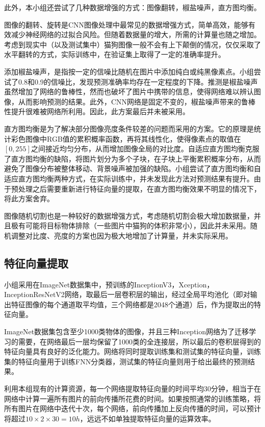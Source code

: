 \documentclass[10.5pt,twocolumn]{jbuaa}
\begin{document}
此外，本小组还尝试了几种数据增强的方式：图像翻转，椒盐噪声，直方图均衡。

图像的翻转、旋转是CNN图像处理中最常见的数据增强方式，简单高效，能够有效减少神经网络的过拟合风险。但随着数据量的增大，所需的计算量也随之增加。考虑到现实中（以及测试集中）猫狗图像一般不会有上下颠倒的情况，仅仅采取了水平翻转的方式，实际训练中，在验证集上取得了一定的准确率提升。

添加椒盐噪声，是指按一定的信噪比随机在图片中添加纯白或纯黑像素点。小组尝试了0.8和0.9的信噪比，发现预测准确率均存在一定程度的下降。推测是椒盐噪声虽然增加了网络的鲁棒性，然而也破坏了图片中携带的信息，使得网络难以辨认图像，从而影响预测的结果。此外，CNN网络是固定不变的，椒盐噪声带来的鲁棒性提升很难被网络所利用。因此，此方案最后并未被采用。

直方图均衡是为了解决部分图像亮度条件较差的问题而采用的方案。它的原理是统计彩色图像中RGB值的累积概率函数，再将其线性化，使得像素点的取值在$[0,255]$之间接近均匀分布，从而增加图像全局的对比度。自适应直方图均衡克服了直方图均衡的缺陷，将图片划分为多个子块，在子块上平衡累积概率分布，从而避免了图像分布被整体移动、背景噪声被加强的缺陷。小组尝试了直方图均衡和自适应直方图均衡两种方式，在实际训练中，并未发现此方法对预测结果有提升。由于预处理之后需要重新进行特征向量的提取，在直方图均衡效果不明显的情况下，将此方案舍弃。

图像随机切割也是一种较好的数据增强方式，考虑随机切割会极大增加数据量，并且极有可能将目标物体排除（一些图片中猫狗的体积非常小），因此并未采用。随机调整对比度、亮度的方案也因为极大地增加了计算量，并未实际采用。
\subsection{特征向量提取}
小组采用在ImageNet数据集中，预训练的InceptionV3，Xception，InceptionResNetV2网络，取最后一层卷积层的输出，经过全局平均池化（即对输出特征图像的每个通道取平均值，三个网络都是2048个通道）后，作为提取出的特征向量。

ImageNet数据集包含至少1000类物体的图像，并且三种Inception网络为了迁移学习的需要，在网络最后一层均保留了1000类的全连接层，所以最后的卷积层得到的特征向量具有良好的泛化能力。网络将同时提取训练集和测试集的特征向量，训练集的特征向量用于训练FNN分类器，测试集的特征向量则用于给出最终的预测结果。

利用本组现有的计算资源，每一个网络提取特征向量的时间平均30分钟，相当于在网络中计算一遍所有图片的前向传播所花费的时间。如果按照通常的训练策略，将所有图片在网络中迭代十次，每个网络，前向传播加上反向传播的时间，可以预计将超过$10\times2\times30=10h$，远远不如单独提取特征向量的运算效率。
\end{document}
